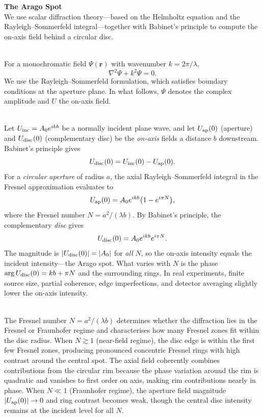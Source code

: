 \begin{technical}
{\Large\textbf{The Arago Spot}}\\[0.25em]

We use scalar diffraction theory—based on the Helmholtz equation and the Rayleigh–Sommerfeld integral—together with Babinet's principle to compute the on-axis field behind a circular disc.

\\[0.4em]
For a monochromatic field $\Psi(\mathbf{r})$ with wavenumber $k=2\pi/\lambda$,
\[
\nabla^2 \Psi + k^2 \Psi = 0.
\]
We use the Rayleigh–Sommerfeld formulation, which satisfies boundary conditions at the aperture plane. In what follows, $\Psi$ denotes the complex amplitude and $U$ the on-axis field.

\\[0.4em]
Let $U_{\rm inc} = A_0 e^{ikb}$ be a normally incident plane wave, and let $U_{\rm ap}(0)$ (aperture) and $U_{\rm disc}(0)$ (complementary disc) be the \emph{on-axis} fields a distance $b$ downstream. Babinet's principle gives
\[
U_{\rm disc}(0) = U_{\rm inc}(0) - U_{\rm ap}(0).
\]
For a \emph{circular aperture} of radius $a$, the axial Rayleigh–Sommerfeld integral in the Fresnel approximation evaluates to
\[
U_{\rm ap}(0) = A_0 e^{ikb} \bigl(1 - e^{i\pi N}\bigr),
\]
where the Fresnel number $N = a^{2}/(\lambda b)$. By Babinet's principle, the complementary \emph{disc} gives
\[
U_{\rm disc}(0) = A_0 e^{ikb} e^{i\pi N}.
\]
The magnitude is $|U_{\rm disc}(0)| = |A_0|$ for \emph{all} $N$, so the on-axis intensity equals the incident intensity—the Arago spot. What varies with $N$ is the phase $\arg U_{\rm disc}(0) = kb + \pi N$ and the surrounding rings. In real experiments, finite source size, partial coherence, edge imperfections, and detector averaging slightly lower the on-axis intensity.

\\[0.4em]
The Fresnel number $N = a^{2}/(\lambda b)$ determines whether the diffraction lies in the Fresnel or Fraunhofer regime and characterises how many Fresnel zones fit within the disc radius. When $N\gtrsim 1$ (near-field regime), the disc edge is within the first few Fresnel zones, producing pronounced concentric Fresnel rings with high contrast around the central spot. The axial field coherently combines contributions from the circular rim because the phase variation around the rim is quadratic and vanishes to first order on axis, making rim contributions nearly in phase. When $N\ll 1$ (Fraunhofer regime), the aperture field magnitude $|U_{\rm ap}(0)| \to 0$ and ring contrast becomes weak, though the central disc intensity remains at the incident level for all $N$.


\end{technical}

